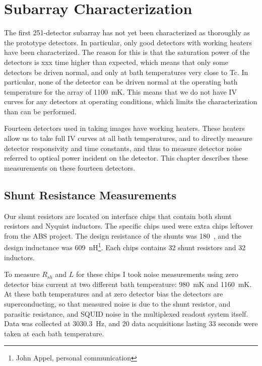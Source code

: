 \chapter{Subarray Characterization}\label{c:det-array}

The first 251-detector subarray has not yet been characterized as thoroughly as the prototype detectors.
In particular, only good detectors with working heaters have been characterized.
The reason for this is that the saturation power of the detectors is xxx time higher than expected, which means that only some detectors be driven normal, and only at bath temperatures very close to Tc.
In particular, none of the detector can be driven normal at the operating bath temperature for the array of 1100~mK.
This means that we do not have IV curves for any detectors at operating conditions, which limits the characterization than can be performed.

Fourteen detectors used in taking images have working heaters.
These heaters allow us to take full IV curves at all bath temperatures, and to directly measure detector responsivity and time constants, and thus to measure detector noise referred to optical power incident on the detector.
This chapter describes these measurements on these fourteen detectors.

\section{Shunt Resistance Measurements}

Our shunt resistors are located on interface chips that contain both shunt resistors and Nyquist inductors.
The specific chips used were extra chips leftover from the ABS\cite{EssingerHileman:2010hh} project.
The design resistance of the shunts was 180~\uOhm, and the design inductance was 609~nH\footnote{John Appel, personal communication}.
Each chips contains 32 shunt resistors and 32 inductors.

To measure $R_{sh}$ and $L$ for these chips I took noise measurements using zero detector bias current at two different bath temperature: 980~mK and 1160~mK.
At these bath temperatures and at zero detector bias the detectors are superconducting, so that measured noise is due to the shunt resistor, and parasitic resistance, and SQUID noise in the multiplexed readout system itself.
Data was collected at 3030.3~Hz, and 20 data acquisitions lasting 33 seconds were taken at each bath temperature.

